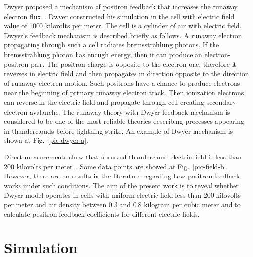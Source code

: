 \documentclass[utf8]{webofc}
\begin{document}
    Dwyer proposed a mechanism of positron feedback that increases the runaway electron flux~\cite{dwyer2003fundamental}. Dwyer constructed his simulation in the cell with electric field value of 1000 kilovolts per meter. The cell is a cylinder of air with electric field. Dwyer’s feedback mechanism is described briefly as follows. A runaway electron propagating through such a cell radiates bremsstrahlung photons. If the bremsstrahlung photon has enough energy, then it can produce an electron-positron pair. The positron charge is opposite to the electron one, therefore it reverses in electric field and then propagates in direction opposite to the direction of runaway electron motion. Such positrons have a chance to produce electrons near the beginning of primary runaway electron track. Then ionization electrons can reverse in the electric field and propagate through cell creating secondary electron avalanche. The runaway theory with Dwyer feedback mechanism is considered to be one of the most reliable theories describing processes appearing in thunderclouds before lightning strike. An example of Dwyer mechanism is shown at Fig.~\ref{pic-dwyer-a}.
    
    Direct measurements show that observed thundercloud electric field is less than 200 kilovolts per  meter~\cite{mazin1989clouds, marshall1995electric}. Some data points are showed at Fig.~\ref{pic-field-b}. However, there are no results in the literature regarding how positron feedback works under such conditions. The aim of the present work is to reveal whether Dwyer model operates in cells with uniform electric field less than 200 kilovolts per meter and air density between 0.3 and 0.8 kilogram per cubic meter and to calculate positron feedback coefficients for different electric fields. %
    \section{Simulation}
    
\end{document}
